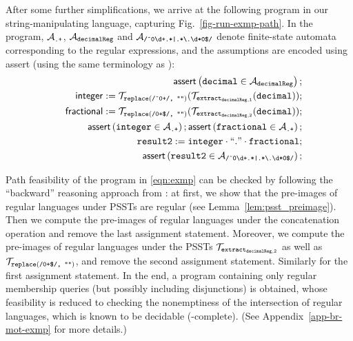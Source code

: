 After some further simplifications, we arrive at the following program
in our string-manipulating language, capturing Fig.~\ref{fig-run-exmp-path}.  In
the program, $\mathcal{A}_{\scriptsize\mbox{\tt.+}}$, $\mathcal{A}_{\tt decimalReg}$
and
$\mathcal{A}_{\scriptsize\mbox{\tt /\^{}0\textbackslash
    d+.*|.*{\scriptsize\textbackslash}.\textbackslash d*0\$/}}$ denote
finite-state automata corresponding to the regular expressions, and
the assumptions are encoded using \textsf{assert} (using the same
terminology as \cite{CHL+19}):
\begin{eqnarray}\label{eqn:exmp}
& & \textsf{assert}\left(\tt decimal \in \mathcal{A}_{decimalReg}\right);\nonumber \\
& & \sf integer  := \tt  \mathcal{T}_{\tt replace(\mbox{\scriptsize \tt /\^{}0+/, ""})}(\mathcal{T}_{\tt extract_{decimalReg,1}}(decimal));\nonumber \\
& & \sf fractional  := \tt  \mathcal{T}_{\scriptsize\tt replace(\mbox{\tt /0+\$/, ""})}(\mathcal{T}_{\tt extract_{decimalReg,2}}(decimal)); \\
&&  \textsf{assert}\left(\tt integer \in \mathcal{A}_{\scriptsize\mbox{\tt.+}}\right); 
\textsf{assert}\left(\tt fractional \in \mathcal{A}_{\scriptsize\mbox{\tt.+}}\right); \nonumber\\
 && \tt result2 := integer \cdot ``." \cdot fractional; \nonumber\\
 && \textsf{assert}\left(\tt result2 \in \mathcal{A}_{\scriptsize\mbox{\tt /\^{}0\textbackslash d+.*|.*{\scriptsize\textbackslash}.\textbackslash d*0\$/}}\right); \nonumber
\end{eqnarray}

Path feasibility of the program in \eqref{eqn:exmp} can be checked by following the ``backward'' reasoning approach from \cite{CHL+19}: at first, we show that the pre-images of regular languages under PSSTs are regular (see Lemma~\ref{lem:psst_preimage}). Then we compute the pre-images of regular languages under the concatenation operation and remove the last assignment statement. Moreover, we compute the pre-images of regular languages under the PSSTs $\mathcal{T}_{\tt extract_{decimalReg,2}}$ as well as $\mathcal{T}_{\scriptsize\tt replace(\mbox{\tt /0+\$/, ""})}$, and remove the second assignment statement. Similarly for the first assignment statement. In the end, a program containing only regular membership queries (but possibly including disjunctions) is obtained, whose feasibility is reduced to checking the nonemptiness of the intersection of regular languages, which is known to be decidable (\pspace-complete). (See Appendix~\ref{app-br-mot-exmp} for more details.)
